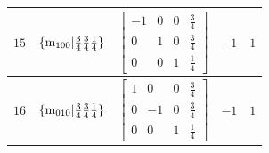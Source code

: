 \documentclass[fleqn,8pt]{jsarticle}
\begin{document}
\begin{longtable}{ccccc}
$ 15 $ & $ \{{\rm m}_{100}|\frac{3}{4} \frac{3}{4} \frac{1}{4}\} $ & $ \begin{bmatrix} -1 & 0 & 0 & \frac{3}{4} \\ 0 & 1 & 0 & \frac{3}{4} \\ 0 & 0 & 1 & \frac{1}{4} \end{bmatrix} $ & $ -1 $ & $ 1 $ \\ \hline
$ 16 $ & $ \{{\rm m}_{010}|\frac{3}{4} \frac{3}{4} \frac{1}{4}\} $ & $ \begin{bmatrix} 1 & 0 & 0 & \frac{3}{4} \\ 0 & -1 & 0 & \frac{3}{4} \\ 0 & 0 & 1 & \frac{1}{4} \end{bmatrix} $ & $ -1 $ & $ 1 $ \\
\end{longtable}
\end{document}
